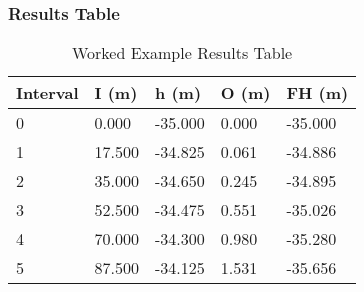 \documentclass{bcrre_exam}
\begin{document}
\subsubsection*{Results Table}

\begin{table}[h]
\centering
\caption{Worked Example Results Table}
\label{tab:vc_example}
\begin{tabular}{@{}lllll@{}}
\toprule
Interval & I (m)  & h (m)   & O (m) & FH (m)  \\ \midrule
0        & 0.000  & -35.000 & 0.000 & -35.000 \\
1        & 17.500 & -34.825 & 0.061 & -34.886 \\
2        & 35.000 & -34.650 & 0.245 & -34.895 \\
3        & 52.500 & -34.475 & 0.551 & -35.026 \\
4        & 70.000 & -34.300 & 0.980 & -35.280 \\
5        & 87.500 & -34.125 & 1.531 & -35.656 \\ \bottomrule
\end{tabular}
\end{table}
\end{document}

